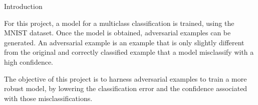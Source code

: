 \begin{frame}{Introduction}

For this project, a model for a multiclass classification is trained, using the MNIST dataset. Once the model is obtained, adversarial examples can be generated. An adversarial example is an example that is only slightly different from the original and correctly classified example that a model misclassify with a high confidence.

\vspace{0.1in}

The objective of this project is to harness adversarial examples to train a more robust model, by lowering the classification error and the confidence associated with those misclassifications.

\end{frame}

